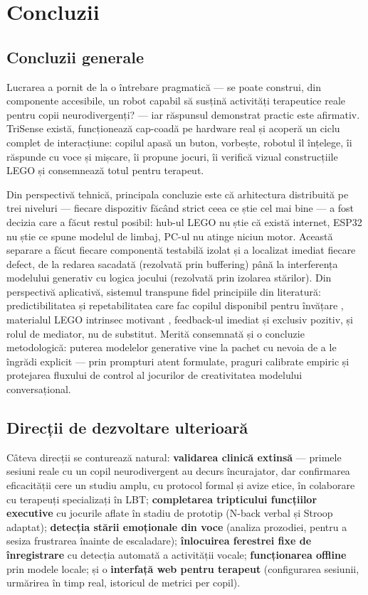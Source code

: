 \chapter{Concluzii}
\label{cap:concluzii}

\section{Concluzii generale}

Lucrarea a pornit de la o întrebare pragmatică — se poate construi, din componente accesibile, un robot capabil să susțină activități terapeutice reale pentru copii neurodivergenți? — iar răspunsul demonstrat practic este afirmativ. TriSense există, funcționează cap-coadă pe hard\-ware real și acoperă un ciclu complet de interacțiune: copilul apasă un buton, vorbește, robotul îl înțelege, îi răspunde cu voce și mișcare, îi propune jocuri, îi verifică vizual construcțiile LEGO și consemnează totul pentru terapeut.

Din perspectivă tehnică, principala concluzie este că arhitectura distribuită pe trei niveluri — fiecare dispozitiv făcând strict ceea ce știe cel mai bine — a fost decizia care a făcut restul posibil: hub-ul LEGO nu știe că există internet, ESP32 nu știe ce spune modelul de limbaj, PC-ul nu atinge niciun motor. Această separare a făcut fiecare componentă testabilă izolat și a localizat imediat fiecare defect, de la redarea sacadată (rezolvată prin buffering) până la interferența modelului generativ cu logica jocului (rezolvată prin izolarea stărilor). Din perspectivă aplicativă, sistemul transpune fidel principiile din literatură: predictibilitatea și repetabilitatea care fac copilul disponibil pentru învățare \cite{scassellati2012, dautenhahn2004}, materialul LEGO intrinsec motivant \cite{legoff2004, owens2008}, feedback-ul imediat și exclusiv pozitiv, și rolul de mediator, nu de substitut. Merită consemnată și o concluzie metodologică: puterea modelelor generative vine la pachet cu nevoia de a le îngrădi explicit — prin prompturi atent formulate, praguri calibrate empiric și protejarea fluxului de control al jocurilor de creativitatea modelului conversațional.

\section{Direcții de dezvoltare ulterioară}

Câteva direcții se conturează natural: \textbf{validarea clinică extinsă} — primele sesiuni reale cu un copil neurodivergent au decurs încurajator, dar confirmarea eficacității cere un studiu amplu, cu protocol formal și avize etice, în colaborare cu terapeuți specializați în LBT; \textbf{completarea tripticului funcțiilor executive} cu jocurile aflate în stadiu de prototip (N-back verbal și Stroop adaptat); \textbf{detecția stării emoționale din voce} (analiza prozodiei, pentru a sesiza frustrarea înainte de escaladare); \textbf{înlocuirea ferestrei fixe de înregistrare} cu detecția automată a activității vocale; \textbf{funcționarea offline} prin modele locale; și o \textbf{interfață web pentru terapeut} (configurarea sesiunii, urmărirea în timp real, istoricul de metrici per copil).

